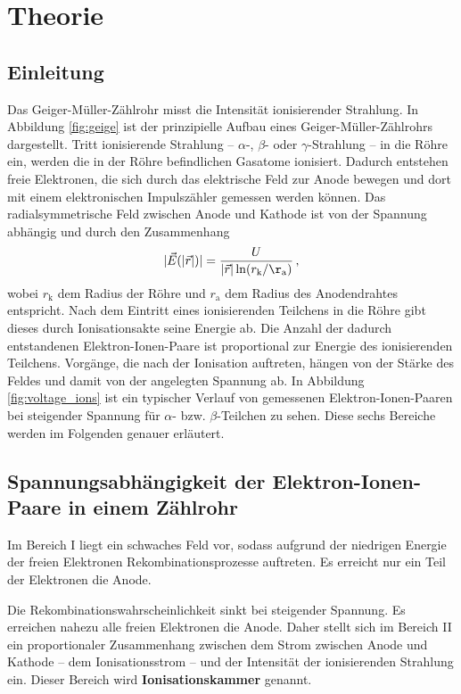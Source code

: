 \section{Theorie}
\label{sec:Theorie}

\subsection{Einleitung}
Das Geiger-Müller-Zählrohr misst die Intensität ionisierender Strahlung.
In Abbildung \ref{fig:geige} ist der prinzipielle Aufbau eines Geiger-Müller-Zählrohrs 
dargestellt.
Tritt ionisierende Strahlung -- $\alpha$-, $\beta$- oder $\gamma$-Strahlung -- in die Röhre
ein, werden die in der Röhre befindlichen Gasatome ionisiert. Dadurch entstehen freie Elektronen,
die sich durch das elektrische Feld zur Anode bewegen und dort mit einem elektronischen 
Impulszähler gemessen werden können.
Das radialsymmetrische Feld zwischen Anode und Kathode ist von der Spannung abhängig und durch
den Zusammenhang
\begin{equation}
	|\vec{E}(|\vec{r}|)| = \frac{U}{|\vec{r}| \ln(r_{\mathrm{k}} / \r_{\mathrm{a}})} \, \mathrm{,}
\end{equation}
wobei $r_{\mathrm{k}}$ dem Radius der Röhre und $r_{\mathrm{a}}$ dem Radius des Anodendrahtes 
entspricht.
Nach dem Eintritt eines ionisierenden Teilchens in die Röhre gibt dieses durch Ionisationsakte
seine Energie ab. Die Anzahl der dadurch entstandenen Elektron-Ionen-Paare ist proportional
zur Energie des ionisierenden Teilchens.
Vorgänge, die nach der Ionisation auftreten, hängen von der Stärke des Feldes und damit von der
angelegten Spannung ab.
In Abbildung \ref{fig:voltage_ions} ist ein typischer Verlauf von gemessenen
Elektron-Ionen-Paaren bei steigender Spannung für $\alpha$- bzw. $\beta$-Teilchen zu sehen.
Diese sechs Bereiche werden im Folgenden genauer erläutert.
\FloatBarrier
\subsection{Spannungsabhängigkeit der Elektron-Ionen-Paare in einem Zählrohr}
Im Bereich I liegt ein schwaches Feld vor, sodass aufgrund der niedrigen Energie der
freien Elektronen Rekombinationsprozesse auftreten. Es erreicht nur ein Teil der Elektronen
die Anode.

Die Rekombinationswahrscheinlichkeit sinkt bei steigender Spannung. Es erreichen nahezu alle
freien Elektronen die Anode.
Daher stellt sich im Bereich II ein proportionaler Zusammenhang zwischen dem Strom zwischen
Anode und Kathode -- dem Ionisationsstrom -- und der Intensität der ionisierenden Strahlung ein.
Dieser Bereich wird \textbf{Ionisationskammer} genannt.

